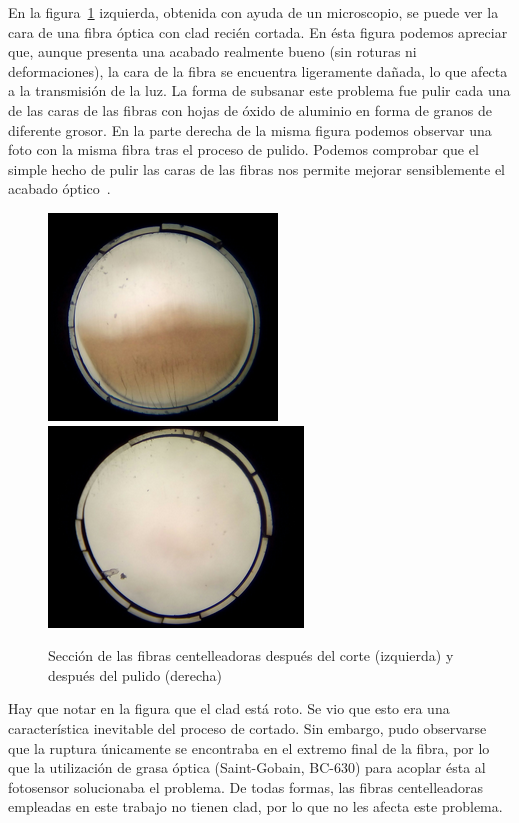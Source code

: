 En la figura~\ref{Pulido} izquierda, obtenida  con ayuda de un microscopio, se puede ver  la cara de una fibra óptica con clad recién cortada. En ésta  figura podemos apreciar que, aunque presenta una acabado realmente bueno (sin roturas ni deformaciones), la cara de la fibra se encuentra ligeramente dañada,  lo que afecta a la transmisión de la luz. La forma de subsanar este problema fue pulir cada una de las caras de las fibras con hojas de óxido de aluminio en forma de granos de diferente grosor. En la parte derecha de la misma figura podemos observar una foto con la misma fibra tras el proceso de pulido. Podemos comprobar que el simple hecho de pulir las caras de las fibras nos permite mejorar sensiblemente el  acabado óptico~\cite{Alberto, manual}.
\begin{figure}[htb]
\centering
{
\includegraphics[scale=0.6]{SinPulir.png} 
}
{
\includegraphics[scale=0.6]{Pulida.png} 
}
\caption{Sección de las fibras centelleadoras después del corte (izquierda) y después del pulido (derecha)\label{Pulido}}
\end{figure} 
Hay que notar en la figura que el clad está roto. Se vio que esto era una característica inevitable del proceso de cortado. Sin embargo, pudo observarse que la ruptura únicamente se encontraba en el extremo final de la fibra, por lo que  la utilización de grasa óptica  (Saint-Gobain, BC-630) para acoplar ésta al fotosensor solucionaba el problema.  De todas formas, las fibras centelleadoras empleadas en este trabajo no tienen clad, por lo que no les afecta este problema. 

